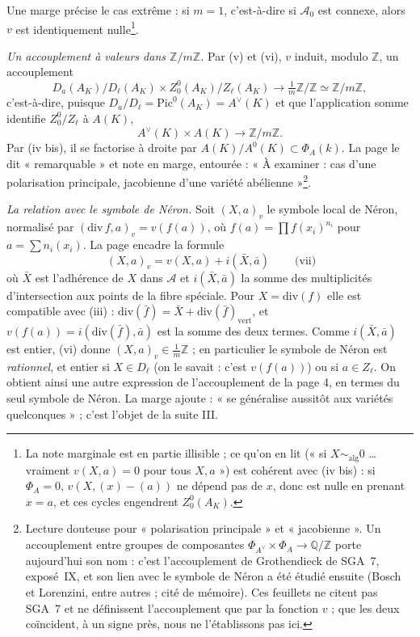 \documentclass[11pt,a4paper]{article}
\begin{document}
Une marge précise le cas extrême : si $m = 1$, c'est-à-dire si
$\mathcal{A}_0$ est connexe, alors $v$ est identiquement nulle\footnote{La
note marginale est en partie illisible ; ce qu'on en lit (« si
$X \sim_{\mathrm{alg}} 0$ … vraiment $v(X,a) = 0$ pour tous $X, a$ ») est
cohérent avec (iv bis) : si $\Phi_A = 0$, $v(X, (x)-(a))$ ne dépend pas de
$x$, donc est nulle en prenant $x = a$, et ces cycles engendrent
$Z_0^0(A_K)$.}.

\emph{Un accouplement à valeurs dans $\mathbb{Z}/m\mathbb{Z}$.} Par
(v) et (vi), $v$ induit, modulo $\mathbb{Z}$, un accouplement
\[
  D_a(A_K)/D_\ell(A_K) \times Z_0^0(A_K)/Z_\ell(A_K)
  \longrightarrow \tfrac{1}{m}\mathbb{Z}/\mathbb{Z} \simeq \mathbb{Z}/m\mathbb{Z},
\]
c'est-à-dire, puisque $D_a/D_\ell = \mathrm{Pic}^0(A_K) = A^\vee(K)$ et que
l'application somme identifie $Z_0^0/Z_\ell$ à $A(K)$,
\[
  A^\vee(K) \times A(K) \longrightarrow \mathbb{Z}/m\mathbb{Z}.
\]
Par (iv bis), il se factorise à droite par $A(K)/A^0(K) \subset \Phi_A(k)$.
La page le dit « remarquable » et note en marge, entourée : « À examiner :
cas d'une polarisation principale, jacobienne d'une variété
abélienne »\footnote{Lecture douteuse pour « polarisation principale »
et « jacobienne ». Un accouplement entre groupes de composantes
$\Phi_{A^\vee} \times \Phi_A \to \mathbb{Q}/\mathbb{Z}$ porte aujourd'hui son
nom : c'est l'accouplement de Grothendieck de SGA~7, exposé~IX, et son lien
avec le symbole de Néron a été étudié ensuite (Bosch et Lorenzini, entre
autres ; cité de mémoire). Ces feuillets ne citent pas SGA~7 et ne
définissent l'accouplement que par la fonction $v$ ; que les deux
coïncident, à un signe près, nous ne l'établissons pas ici.}.

\emph{La relation avec le symbole de Néron.} Soit $(X, a)_v$ le
symbole local de Néron, normalisé par $(\mathrm{div}\,f, a)_v = v(f(a))$,
où $f(a) = \prod f(x_i)^{n_i}$ pour $a = \sum n_i (x_i)$. La page encadre
la formule
\[
  \boxed{\ (X, a)_v = v(X, a) + i(\bar X, \bar a)\ }
  \qquad \text{(vii)}
\]
où $\bar X$ est l'adhérence de $X$ dans $\mathcal{A}$ et $i(\bar X, \bar a)$
la somme des multiplicités d'intersection aux points de la fibre spéciale.
Pour $X = \mathrm{div}(f)$ elle est compatible avec (iii) :
$\mathrm{div}(\bar f) = \bar X + \mathrm{div}(\bar f)_{\mathrm{vert}}$, et
$v(f(a)) = i(\mathrm{div}(\bar f), \bar a)$ est la somme des deux termes.
Comme $i(\bar X, \bar a)$ est entier, (vi) donne
$(X, a)_v \in \frac{1}{m}\mathbb{Z}$ ; en particulier le symbole de Néron
est \emph{rationnel}, et entier si $X \in D_\ell$ (on le savait :
c'est $v(f(a))$) ou si $a \in Z_\ell$. On obtient ainsi une autre
expression de l'accouplement de la page 4, en termes du seul symbole de
Néron. La marge ajoute : « se généralise aussitôt aux variétés
quelconques » ; c'est l'objet de la suite III.
\end{document}
